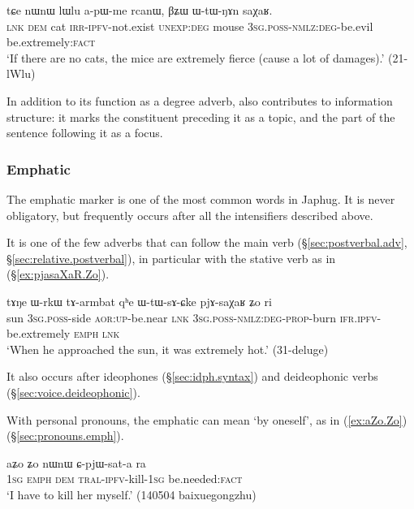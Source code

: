\begin{exe}
	\ex \label{ex:apWme.rcanW}
	\gll  tɕe nɯnɯ lɯlu a-pɯ-me rcanɯ, βʑɯ ɯ-tɯ-ŋɤn saχaʁ. \\
	\textsc{lnk} \textsc{dem} cat \textsc{irr}-\textsc{ipfv}-not.exist \textsc{unexp}:\textsc{deg} mouse
	\textsc{3sg}.\textsc{poss}-\textsc{nmlz}:\textsc{deg}-be.evil be.extremely:\textsc{fact} \\ 
	\glt `If there are no cats, the mice are extremely fierce (cause a lot of damages).' (21-lWlu) 
\end{exe}

In addition to its function as a degree adverb,   also contributes to information structure: it marks the constituent preceding it as a topic, and the part of the sentence following it as a focus.
 
\subsubsection{Emphatic} \label{sec:emphatic.Zo} 
The emphatic marker  is one of the most common words in Japhug. It is never obligatory, but frequently occurs after all the intensifiers described above. 

It is one of the few adverbs that can follow the main verb (§\ref{sec:postverbal.adv}, §\ref{sec:relative.postverbal}), in particular with the stative verb  as in (§\ref{ex:pjasaXaR.Zo}).

\begin{exe}
	\ex \label{ex:pjasaXaR.Zo}
	\gll tɤŋe ɯ-rkɯ tɤ-armbat qʰe ɯ-tɯ-sɤ-ɕke pjɤ-saχaʁ ʑo ri \\
	sun \textsc{3sg}.\textsc{poss}-side \textsc{aor}:\textsc{up}-be.near \textsc{lnk} \textsc{3sg}.\textsc{poss}-\textsc{nmlz}:\textsc{deg}-\textsc{prop}-burn \textsc{ifr}.\textsc{ipfv}-be.extremely \textsc{emph} \textsc{lnk} \\
	\glt `When he approached the sun, it was extremely hot.' (31-deluge)
	\end{exe}
	
It also occurs after ideophones (§\ref{sec:idph.syntax}) and deideophonic verbs (§\ref{sec:voice.deideophonic}).

With personal pronouns, the emphatic  can mean `by oneself', as in (\ref{ex:aZo.Zo}) (§\ref{sec:pronouns.emph}).

\begin{exe}
\ex \label{ex:aZo.Zo}
\gll aʑo ʑo nɯnɯ ɕ-pjɯ-sat-a ra \\
\textsc{1sg} \textsc{emph} \textsc{dem} \textsc{tral}-\textsc{ipfv}-kill-\textsc{1sg} be.needed:\textsc{fact} \\
\glt `I have to kill her myself.' (140504 baixuegongzhu)
\end{exe}

